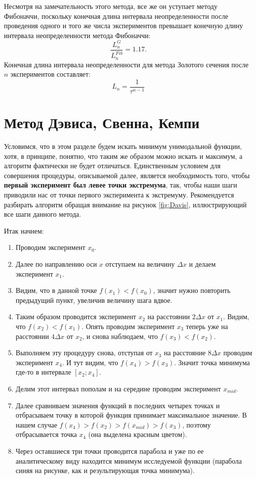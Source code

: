 Несмотря на замечательность этого метода, все же он уступает методу Фибоначчи, поскольку конечная длина интервала неопределенности после проведения одного и того же числа экспериментов превышает конечную длину интервала неопределенности метода Фибоначчи:
\begin{equation*}
    \frac{L_n^{G}}{L_n^{Fib}} = 1.17.
\end{equation*}
Конечная длина интервала неопределенности для метода Золотого сечения после $n$ экспериментов составляет:
\begin{equation}
    L_n = \frac1{\tau^{n-1}}
\end{equation}
\section{Метод Дэвиса, Свенна, Кемпи}
Условимся, что в этом разделе будем искать минимум унимодальной функции, хотя, в принципе, понятно, что таким же образом можно искать и максимум, а алгоритм фактически не будет отличаться. Единственным условием для совершения процедуры, описываемой далее, является необходимость того, чтобы \textbf{первый эксперимент был левее точки экстремума}, так, чтобы наши шаги приводили нас от точки первого эксперимента к экстремуму. Рекомендуется разбирать алгоритм обращая внимание на рисунок \ref{fig:Davis}, иллюстрирующий все шаги данного метода.

Итак начнем:
\begin{enumerate}
    \item Проводим эксперимент $x_0$.
    \item Далее по направлению оси $x$ отступаем на величину $\Delta x$ и делаем эксперимент $x_1$.
    \item Видим, что в данной точке $f(x_1) < f(x_0)$, значит нужно повторить предыдущий пункт, увеличив величину шага вдвое.
    \item Таким образом проводится эксперимент $x_2$ на расстоянии $2 \Delta x$ от $x_1$. Видим, что $f(x_2) < f(x_1)$. Опять проводим эксперимент $x_3$ теперь уже на расстоянии $4 \Delta x$ от $x_2$, и снова наблюдаем, что $f(x_3) < f(x_2)$.
    \item Выполняем эту процедуру снова, отступая от $x_3$ на расстояние $8 \Delta x$ проводим эксперимент $x_4$. И тут видим, что $f(x_4) > f(x_3)$. Значит точка минимума где-то в интервале $[x_2; x_4]$.
    \item Делим этот интервал пополам и на середине проводим эксперимент $x_{mid}$.
    \item Далее сравниваем значения функций в последних четырех точках и отбрасываем точку в которой функция принимает максимальное значение. В нашем случае $f(x_4) > f(x_2) > f(x_{mid}) > f(x_3)  $, поэтому отбрасывается точка $x_4$ (она выделена красным цветом).
    \item Через оставшиеся три точки проводится парабола и уже по ее аналитическому виду находится минимум исследуемой функции (парабола синяя на рисунке, как и результирующая точка минимума).
\end{enumerate}

